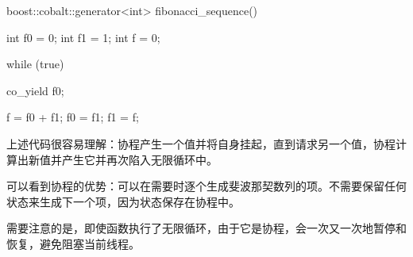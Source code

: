 \begin{cpp}
boost::cobalt::generator<int> fibonacci_sequence() {
    int f0 = 0;
    int f1 = 1;
    int f = 0;

    while (true) {
        co_yield f0;

        f = f0 + f1;
        f0 = f1;
        f1 = f;
    }
}
\end{cpp}

上述代码很容易理解：协程产生一个值并将自身挂起，直到请求另一个值，协程计算出新值并产生它并再次陷入无限循环中。

可以看到协程的优势：可以在需要时逐个生成斐波那契数列的项。不需要保留任何状态来生成下一个项，因为状态保存在协程中。

需要注意的是，即使函数执行了无限循环，由于它是协程，会一次又一次地暂停和恢复，避免阻塞当前线程。










